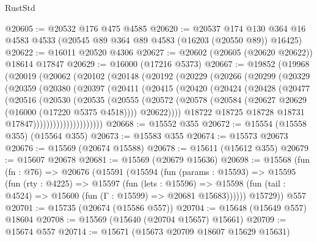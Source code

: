 \begin{lexlean}{RustStd}
\begin{coremodule}
@20605 := @20532 @176 @475 @4585
@20620 := @20537
    @174
    @130
    @364
    @16
    @4583
    @4533
    (@20545 @89 @364 @89 @4583 (@16203 (@20550 @89)) @16425)
@20622 := @16011 @20520 @4306
@20627 := @20602 (@20605 (@20620 @20622)) @18614 @17847
@20629 := @16000 (@17216 @5373)
@20667 := @19852
    (@19968
      (@20019
        (@20062
          (@20102
            (@20148
              (@20192
                (@20229
                  (@20266
                    (@20299
                      (@20329
                        (@20359
                          (@20380
                            (@20397
                              (@20411
                                (@20415
                                  (@20420
                                    (@20424
                                      (@20428
                                        (@20477
                                          (@20516
                                            (@20530
                                              (@20535
                                                (@20555
                                                  (@20572
                                                    (@20578
                                                      (@20584
                                                        (@20627
                                                          @20629
                                                          (@16000 (@17220 @5375 @4518))))
                                                      @20622))))
                                              @18722
                                              @18725
                                              @18728
                                              @18731
                                              @17847)))))))))))))))))))))
@20668 := @15552 @355
@20672 := @15554 (@15558 @355) (@15564 @355)
@20673 := @15583 @355
@20674 := @15573 @20673
@20676 := @15569 (@20674 @15588)
@20678 := @15611 (@15612 @355)
@20679 := @15607 @20678
@20681 := @15569 (@20679 @15636)
@20698 := @15568
    (fun (fn : @76) =>
    @20676
      (@15591
        (@15594
          (fun (params : @15593) =>
          @15595
            (fun (rty : @4225) =>
            @15597
              (fun (lets : @15596) =>
              @15598 (fun (tail : @4524) => @15600 (fun (Γ : @15599) => @20681 @15683))))))
        @15729))
    @557
@20701 := @15735 (@20674 (@15586 @557))
@20704 := @15648 (@15649 @557) @18604
@20708 := @15569 (@15640 (@20704 @15657) @15661)
@20709 := @15674 @557
@20714 := @15671 (@15673 @20709 @18607 @15629 @15631)

\end{coremodule}
\end{lexlean}
